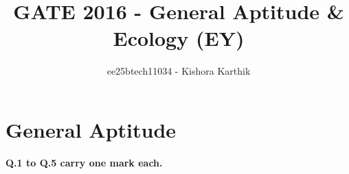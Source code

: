 \documentclass[journal]{IEEEtran}
\begin{document}
\vspace{3cm}


\title{GATE 2016 - General Aptitude \& Ecology (EY)}
\author{ee25btech11034 - Kishora Karthik}
\maketitle

{\let\newpage\relax\maketitle}

\renewcommand{\thefigure}{\theenumi}
\renewcommand{\thetable}{\theenumi}
\setlength{\intextsep}{10pt} 

\section*{\textbf{General Aptitude}}
\textbf{Q.1 to Q.5 carry one mark each.}
 
\end{document}
